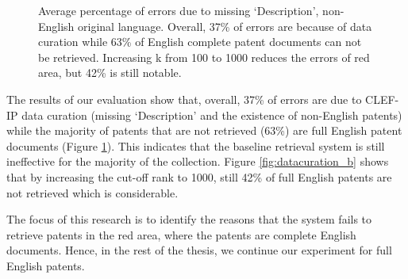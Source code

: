 \begin{figure}[t!]
\begin{centering}
\par\end{centering} 
\protect\caption{Average percentage of errors due to missing `Description', non-English original language. Overall, 37\% of errors are because of data curation while 63\% of English complete patent documents can not be retrieved. Increasing k from 100 to 1000 reduces the errors of red area, but 42\% is still notable.}
\label{fig:datacuration}
\end{figure}
The results of our evaluation show that, overall, 37\% of errors are due to CLEF-IP data curation (missing `Description' and the existence of non-English patents) while the majority of patents that are not retrieved (63\%) are full English patent documents (Figure \ref{fig:datacuration}). This indicates that the baseline retrieval system is still ineffective for the majority of the collection. Figure \ref{fig:datacuration_b} shows that by increasing the cut-off rank to 1000, still 42\% of full English patents are not retrieved which is considerable.

The focus of this research is to identify the reasons that the system fails to retrieve patents in the red area, where the patents are complete English documents. Hence, in the rest of the thesis, we continue our experiment for full English patents.







